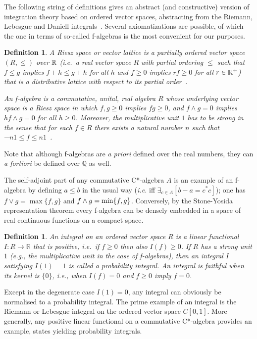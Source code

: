 \documentclass[11pt]{article}
\newcommand{\Q}{\mathbb{Q}}
\newcommand{\alg}[1]{\ensuremath{#1}}
\newcommand{\field}[1]{\ensuremath{\mathbb{#1}}}
\newcommand{\ie}{\textit{i.e.}}
\newtheorem{definition}[theorem]{Definition}
\begin{document}
The following string of definitions gives an abstract (and
constructive) version of integration theory based on ordered vector spaces,
abstracting from the Riemann, Lebesgue and Daniell
integrals~\cite{Coquand/Spitters:integrals-valuations,
coquandspitters05, spitters:caitnoac}.  Several
axiomatizations are possible, of which the one in terms of so-called f-algebras
is the most convenient for our purposes.
\begin{definition}\label{def:falgebra}
  A \emph{Riesz space} or \emph{vector lattice} is a partially ordered
  vector space $(R,\leqslant)$ over ${\mathbb R}$  (\ie\ a real vector space $R$
  with partial ordering $\leqslant$ such that $f \leqslant g$ implies $f+h \leqslant
  g+h$ for all $h$ and $f \geq 0$ implies $rf \geq 0$ for all
  $r\in{\mathbb R}^+$) that is a distributive lattice with respect to its partial
  order~\cite[Definition~11.1]{LuxemburgZaanen}.

  An \emph{f-algebra} is a commutative, unital, real algebra $R$
  whose underlying vector space is a Riesz space in which $f,g \geq
  0$ implies $fg \geq 0$, and $f \wedge g = 0$ implies $hf \wedge g =
  0$ for all $h\geq 0$. Moreover, the multiplicative unit $1$ has to be
  \emph{strong} in the sense that for each $f\in R$ there exists a
  natural number $n$ such that $-n1 \leqslant f \leqslant
  n1$~\cite[Definition~140.8]{Zaanen:RieszII}.
\end{definition}
Note that although f-algebras are {\it a priori} defined over the
real numbers, they can {\it a fortiori} be defined over $\Q$ as well.

The self-adjoint part of any commutative C*-algebra $\alg{A}$ is an
example of an f-algebra by defining $a\leqslant b$ in the usual way (\ie
iff  $\exists_{c \in A}[b-a=c^*c]$); one has $f\vee g=\max\{f,g\}$ and
$f\wedge g=\min\{f,g\}$. Conversely,  by the Stone-Yosida representation
theorem every f-algebra can be densely embedded in a space of real
continuous functions on a compact space.
\begin{definition}
\label{def:probabilityintegral}
  An \emph{integral} on an ordered vector space $R$
  is a linear functional $I:R \to \field{R}$ that is positive,
  \ie\ if $f \geq 0$ then also $I(f) \geq 0$.
  If $R$ has a strong unit $1$ (\emph{e.g.}, the multiplicative unit in the
  case of f-algebras), then an integral $I$ satisfying
  $I(1)=1$ is called a \emph{probability integral}. An integral is
  \emph{faithful} when its kernel is $\{0\}$, \ie, when
  $I(f)=0$ and $f \geq 0$ imply $f=0$.
\end{definition}
Except in the degenerate case $I(1)=0$, any integral can obviously be
normalised to a probability integral.
The prime example of an integral is the Riemann or Lebesgue
integral on the ordered vector space $C[0,1]$. More generally, any
positive linear functional on a commutative C*-algebra provides an example,
states yielding probability integrals.
\end{document}
